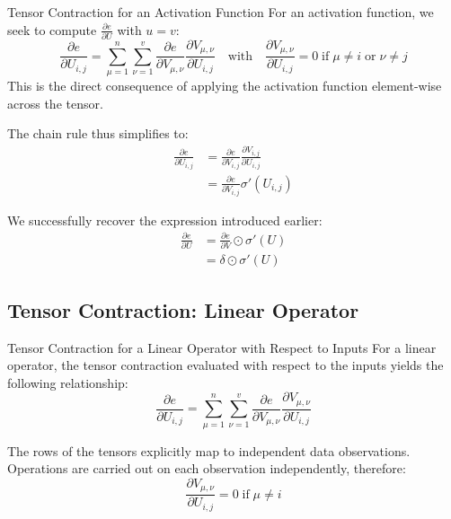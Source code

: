 \begin{frame}{Tensor Contraction for an Activation Function}
	For an activation function, we seek to compute $\frac{\partial{e}}{\partial{U}}$ with $u = v$:
	\begin{equation*}
		\frac{\partial{e}}{\partial{U_{i,j}}} = \sum_{\mu=1}^n \sum_{\nu=1}^v \frac{\partial{e}}{\partial{V_{\mu,\nu}}} \frac{\partial{V_{\mu,\nu}}}{\partial{U_{i,j}}} \quad \text{with} \quad \frac{\partial{V_{\mu,\nu}}}{\partial{U_{i,j}}} = 0 \; \text{if} \; \mu \ne i \; \text{or} \; \nu \ne j
	\end{equation*}
	This is the direct consequence of applying the activation function element-wise across the tensor. \\
	
	\pause
	
	The chain rule thus simplifies to:
	\begin{equation*}
		\begin{aligned}
			\frac{\partial{e}}{\partial{U_{i,j}}} 
			&= \frac{\partial{e}}{\partial{V_{i,j}}} \frac{\partial{V_{i,j}}}{\partial{U_{i,j}}} \\
			&= \frac{\partial{e}}{\partial{V_{i,j}}} \sigma'\left(U_{i,j}\right)
		\end{aligned}
	\end{equation*}
	
	\pause
	
	We successfully recover the expression introduced earlier:
	\begin{equation*}
		\begin{aligned}
			\frac{\partial{e}}{\partial{U}} 
			&= \frac{\partial{e}}{\partial{V}} \odot \sigma'\left(U\right) \\
			&= \delta \odot \sigma'\left(U\right)
		\end{aligned}
	\end{equation*}
\end{frame}

\subsection{Tensor Contraction: Linear Operator}

\begin{frame}{Tensor Contraction for a Linear Operator with Respect to Inputs}
	For a linear operator, the tensor contraction evaluated with respect to the inputs yields the following relationship:
	\begin{equation*}
		\frac{\partial{e}}{\partial{U_{i,j}}} = \sum_{\mu=1}^n \sum_{\nu=1}^v \frac{\partial{e}}{\partial{V_{\mu,\nu}}} \frac{\partial{V_{\mu,\nu}}}{\partial{U_{i,j}}}
	\end{equation*}
	
	\pause
	
	The rows of the tensors explicitly map to independent data observations. Operations are carried out on each observation independently, therefore:
	\begin{equation*}
		\frac{\partial{V_{\mu,\nu}}}{\partial{U_{i,j}}} = 0 \; \text{if} \; \mu \ne i
	\end{equation*}
\end{frame}

